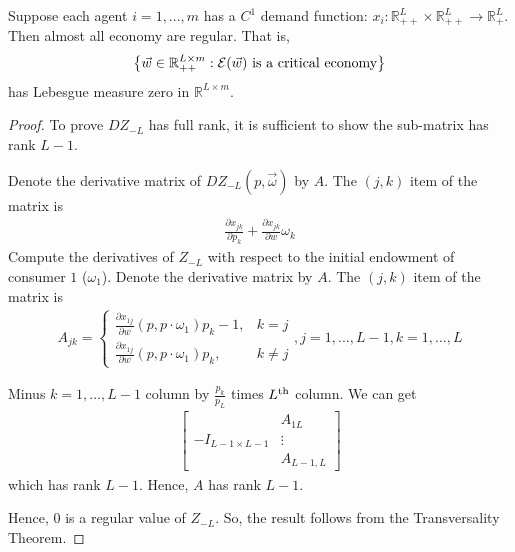 \documentclass[11pt]{elegantbook}
\begin{document}
\begin{theorem}
    Suppose each agent $i=1,...,m$ has a $C^1$ demand function: $x_i:\mathbb{R}_{++}^L\times \mathbb{R}_{++}^{L} \rightarrow \mathbb{R}_+^L$. Then almost all economy are regular. That is,
    \begin{equation}
        \begin{aligned}
            \left\{\vec{w}\in \mathbb{R}_{++}^{L\times m}: \mathcal{E}(\vec{w}) \textnormal{ is a critical economy}\right\}
        \end{aligned}
        \nonumber
    \end{equation}
    has Lebesgue measure zero in $\mathbb{R}^{L\times m}$.
\end{theorem}
\begin{proof}
    To prove $DZ_{-L}$ has full rank, it is sufficient to show the sub-matrix has rank $L-1$.
    
    Denote the derivative matrix of $DZ_{-L}(p,\vec{\omega})$ by $A$. The $(j,k)$ item of the matrix is
    \begin{equation}
        \begin{aligned}
            \frac{\partial x_{jk}}{\partial p_k}+\frac{\partial x_{jk}}{\partial w}\omega_k
        \end{aligned}
        \nonumber
    \end{equation}
    Compute the derivatives of $Z_{-L}$ with respect to the initial endowment of consumer $1$ ($\omega_1$). Denote the derivative matrix by $A$. The $(j,k)$ item of the matrix is
    \begin{equation}
        \begin{aligned}
            A_{jk}=\left\{\begin{matrix}
                \frac{\partial x_{1j}}{\partial w}(p,p\cdot\omega_1)p_k-1,&k=j\\
                \frac{\partial x_{1j}}{\partial w}(p,p\cdot\omega_1)p_k,&k\neq j
            \end{matrix}\right.
            ,j=1,...,L-1, k=1,...,L
        \end{aligned}
        \nonumber
    \end{equation}

    Minus $k=1,...,L-1$ column by $\frac{p_k}{p_L}$ times $L^\textnormal{th}$ column. We can get
    \begin{equation}
        \begin{aligned}
            \begin{bmatrix}
                    &A_{1L}\\
                -I_{L-1\times L-1}	&\vdots\\
                &A_{L-1,L}
            \end{bmatrix}
        \end{aligned}
        \nonumber
    \end{equation}
    which has rank $L-1$. Hence, $A$ has rank $L-1$.

    Hence, $0$ is a regular value of $Z_{-L}$. So, the result follows from the Transversality Theorem.
\end{proof}
\end{document}
